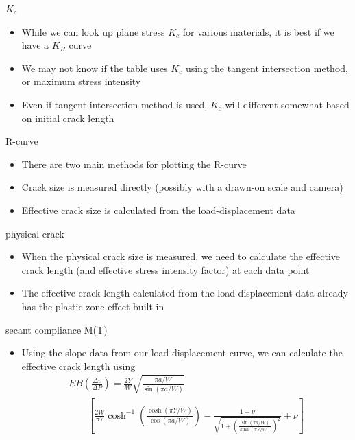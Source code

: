 \documentclass[10pt]{beamer}
\begin{document}
\begin{frame}{$K_c$}
	\begin{itemize}[<+->]
		\item While we can look up plane stress $K_c$ for various materials, it is best if we have a $K_R$ curve
		\item We may not know if the table uses $K_c$ using the tangent intersection method, or maximum stress intensity
		\item Even if tangent intersection method is used, $K_c$ will different somewhat based on initial crack length
	\end{itemize}
\end{frame}

\begin{frame}{R-curve}
	\begin{itemize}
		\item There are two main methods for plotting the R-curve
		\item Crack size is measured directly (possibly with a drawn-on scale and camera)
		\item Effective crack size is calculated from the load-displacement data
	\end{itemize}
\end{frame}

\begin{frame}{physical crack}
	\begin{itemize}
		\item When the physical crack size is measured, we need to calculate the effective crack length (and effective stress intensity factor) at each data point
		\item The effective crack length calculated from the load-displacement data already has the plastic zone effect built in
	\end{itemize}
\end{frame}

\begin{frame}{secant compliance M(T)}
	\begin{itemize}[<+->]
		\item Using the slope data from our load-displacement curve, we can calculate the effective crack length using
		\begin{multline}
		EB\left(\frac{\Delta v}{\Delta P}\right) = \frac{2 Y}{W} \sqrt{\frac{\pi a / W}{\sin (\pi a / W)}} \\
		\qquad \left[\frac{2W}{\pi Y} \cosh^{-1} \left(\frac{\cosh(\pi Y/W)}{\cos (\pi a / W)}\right) - \frac{1+\nu}{\sqrt{1 + \left(\frac{\sin(\pi a/W)}{\sinh (\pi Y/W)}\right)^2}}+\nu\right]
		\end{multline}
	\end{itemize}
\end{frame}
\end{document}
